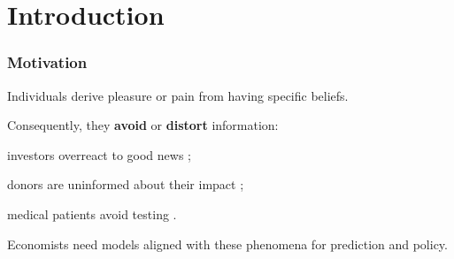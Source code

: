 \documentclass[usenames,dvipsnames,aspectratio=169,11pt, envcountsect, handout]{beamer}
\begin{document}
\section{Introduction}

\begin{frame}
	\maketitle

\end{frame}

\begin{frame}\frametitle{Motivation}

	Individuals derive pleasure or pain from having specific beliefs.

	\vfill

	Consequently, they \textbf{avoid} or \textbf{distort} information:

	\vfill

	\begin{wideitemize}
		\item investors overreact to good news \citep{danielOverconfidentInvestorsPredictable2015};
		\item donors are uninformed about their impact \citep{niehausTheoryGoodIntentions2014};
		\item medical patients avoid testing \citep{golmanInformationAvoidance2017}.
	\end{wideitemize}

	\vfill

	Economists need models aligned with these phenomena for prediction and policy.

\end{frame}
\end{document}

